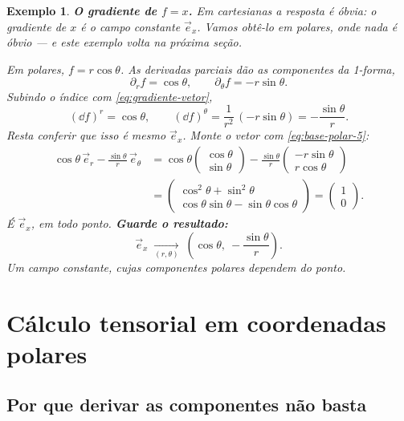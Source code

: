 \documentclass[12pt,a4paper,oneside]{book}
\theoremstyle{rgplain}
\newtheorem{example}{Exemplo}[chapter]
\theoremstyle{rgremark}
\newcommand{\temcomp}[1]{\;\underset{#1}{\longrightarrow}\;}
\begin{document}
\begin{example}
\label{ex:gradiente-x}
\textbf{O gradiente de $f=x$.} Em cartesianas a resposta é óbvia: o gradiente
de $x$ é o campo constante $\vec e_x$. Vamos obtê-lo em polares, onde nada é óbvio --- e este exemplo volta na próxima seção.

Em polares, $f=r\cos\theta$. As derivadas parciais dão as componentes da
1-forma,
\[
  \partial_rf=\cos\theta,
  \qquad
  \partial_\theta f=-r\sin\theta .
\]
Subindo o índice com \eqref{eq:gradiente-vetor},
\[
  (\dd f)^r=\cos\theta,
  \qquad
  (\dd f)^\theta=\frac{1}{r^2}\,(-r\sin\theta)=-\frac{\sin\theta}{r} .
\]
Resta conferir que isso é mesmo $\vec e_x$. Monte o vetor com
\eqref{eq:base-polar-5}:
\begin{align*}
  \cos\theta\,\vec e_r-\frac{\sin\theta}{r}\,\vec e_\theta
  &=\cos\theta\begin{pmatrix}\cos\theta\\\sin\theta\end{pmatrix}
  -\frac{\sin\theta}{r}\begin{pmatrix}-r\sin\theta\\ r\cos\theta\end{pmatrix}\\[4pt]
  &=\begin{pmatrix}\cos^2\theta+\sin^2\theta\\
  \cos\theta\sin\theta-\sin\theta\cos\theta\end{pmatrix}
  =\begin{pmatrix}1\\0\end{pmatrix} .
\end{align*}
É $\vec e_x$, em todo ponto. \textbf{Guarde o resultado:}
\begin{equation}
  \vec e_x \temcomp{(r,\theta)}
  \left(\cos\theta,\ -\frac{\sin\theta}{r}\right) .
  \label{eq:ex-em-polares}
\end{equation}
Um campo constante, cujas componentes polares dependem do ponto.
\end{example}

\section{Cálculo tensorial em coordenadas polares}
\label{sec:calculo-polar}

\subsection*{Por que derivar as componentes não basta}
\end{document}
